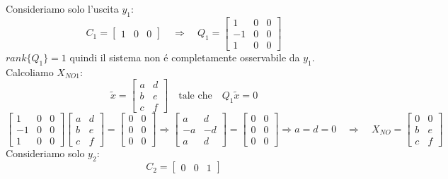 \documentclass[../main.tex]{subfiles}
\begin{document}
\begin{mdframed}[style=Exercise]
\begin{Exercise}[title={Calcolare $ X_{NO} $}, difficulty=1]
				Consideriamo solo l'uscita $ y_1 $:
				\[
					C_1 =
					\begin{bmatrix}
						1 & 0 & 0
					\end{bmatrix}
					\quad\Rightarrow\quad
					Q_1 =
					\begin{bmatrix}
						1 & 0 & 0\\
						-1 & 0 & 0\\
						1 & 0 & 0
					\end{bmatrix}
				\] 
				$ rank\{Q_1\} = 1 $ quindi il sistema non \'e completamente osservabile da $ y_1 $. Calcoliamo $ X_{NO1} $:
				\[
					\tilde x =
					\begin{bmatrix}
						a & d \\
						b & e \\
						c & f
					\end{bmatrix}
					\quad\text{tale che}\quad
					Q_1 \tilde x = 0
				\]
				\[
					\begin{bmatrix}
						1 & 0 & 0\\
						-1 & 0 & 0\\
						1 & 0 & 0
					\end{bmatrix}
					\begin{bmatrix}
						a & d \\
						b & e \\
						c & f
					\end{bmatrix} =
					\begin{bmatrix}
						0 & 0\\
						0 & 0\\
						0 & 0
					\end{bmatrix}
					\Rightarrow
					\begin{bmatrix}
						a & d \\
						-a & -d \\
						a & d
					\end{bmatrix} =
					\begin{bmatrix}
						0 & 0\\
						0 & 0\\
						0 & 0
					\end{bmatrix}
					\Rightarrow a=d=0
					\quad\Rightarrow\quad X_{NO} =
					\begin{bmatrix}
						0 & 0 \\
						b & e \\
						c & f
					\end{bmatrix}
				\]
				Consideriamo solo $ y_2 $:
				\[
					C_2 =
					\begin{bmatrix}
						0 & 0 & 1

\end{bmatrix}\]
\end{Exercise}
\end{mdframed}
\end{document}
